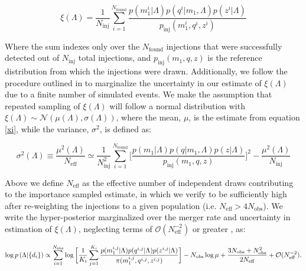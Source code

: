 \documentclass[twocolumn, linenumber]{aastex63}
\begin{document}
\begin{equation} \label{xi}
     \xi(\Lambda) = \frac{1}{N_\mathrm{inj}} \sum_{i=1}^{N_\mathrm{found}} \frac{p(m_1^i | \Lambda) p(q^i | m_1, \Lambda) p(z^i | \Lambda)}{p_\mathrm{inj}(m_1^i, q^i, z^i)}
\end{equation}

\noindent
Where the sum indexes only over the $N_\mathrm{found}$ injections that were successfully detected out of $N_\mathrm{inj}$ total injections, 
and $p_\mathrm{inj}(m_1, q, z)$ is the reference distribution from which the injections were drawn. Additionally, we follow the procedure 
outlined in \citet{Farr_2019} to marginalize the uncertainty in our estimate of $\xi(\Lambda)$ due to a finite number of simulated events. 
We make the assumption that repeated sampling of $\xi(\Lambda)$ will follow a normal distribution with 
$\xi(\Lambda) \sim \mathcal{N}(\mu(\Lambda), \sigma(\Lambda))$, where the mean, $\mu$, is the estimate from equation \ref{xi}, 
while the variance, $\sigma^2$, is defined as:

\begin{equation}
    \sigma^2(\Lambda) \equiv \frac{\mu^2(\Lambda)}{N_\mathrm{eff}} \simeq \frac{1}{N^2_\mathrm{inj}} \sum_{i=1}^{N_\mathrm{found}} \bigg[\frac{p(m_1 | \Lambda) p(q | m_1, \Lambda) p(z | \Lambda)}{p_\mathrm{inj}(m_1, q, z)}\bigg]^2 - \frac{\mu^2(\Lambda)}{N_\mathrm{inj}}
\end{equation}

\noindent
Above we define $N_\mathrm{eff}$ as the effective number of independent draws contributing to the importance sampled estimate, 
in which we verify to be sufficiently high after re-weighting the injections to a given population (i.e. $N_\mathrm{eff} > 4N_\mathrm{obs}$). 
We write the hyper-posterior marginalized over the merger rate and uncertainty in estimation of $\xi(\Lambda)$, neglecting terms of 
$\mathcal{O}(N_\mathrm{eff}^{-2})$ or greater \citep{Farr_2019}, as:

\begin{equation}\label{importance-posterior}
    \log p\left(\Lambda | \{d_i\}\right) \propto \sum_{i=1}^{N_\mathrm{obs}} \log \bigg[ \frac{1}{K_i} \sum_{j=1}^{K_i} \frac{p(m_1^{i,j}|\Lambda)p(q^{i,j}|\Lambda)p(z^{i,j}|\Lambda)}{\pi(m_1^{i,j}, q^{i,j}, z^{i,j})} \bigg] -  \\
    N_\mathrm{obs} \log \mu + \frac{3N_\mathrm{obs} + N_\mathrm{obs}^2}{2N_\mathrm{eff}} + \mathcal{O}(N_\mathrm{eff}^{-2}).
\end{equation}
\end{document}
